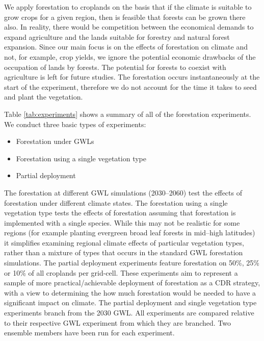 \documentclass[]{article}
\begin{document}
We apply forestation to croplands on the basis that if the climate is suitable to grow crops for a given region, then is feasible that forests can be grown there also. In reality, there would be competition between the economical demands to expand agriculture and the lands suitable for forestry and natural forest expansion.
Since our main focus is on the effects of forestation on climate and not, for example, crop yields, we ignore the potential economic drawbacks of the occupation of lands by forests.
The potential for forests to coexist with agriculture is left for future studies.
The forestation occurs instantaneously at the start of the experiment, therefore we do not account for the time it takes to seed and plant the vegetation.

Table \ref{tab:experiments} shows a summary of all of the forestation experiments. We conduct three basic types of experiments:

\begin{itemize}
    \item Forestation under GWLs
    \item Forestation using a single vegetation type
    \item Partial deployment
\end{itemize}

The forestation at different GWL simulations (2030--2060) test the effects of forestation under different climate states.
The forestation using a single vegetation type tests the effects of forestation assuming that forestation is implemented with a single species.
While this may not be realistic for some regions (for example planting evergreen broad leaf forests in mid--high latitudes) it simplifies examining regional climate effects of particular vegetation types, rather than a mixture of types that occurs in the standard GWL forestation simulations.
The partial deployment experiments feature forestation on 50\%, 25\% or 10\% of all croplands per grid-cell.
These experiments aim to represent a sample of more practical/achievable deployment of forestation as a CDR strategy, with a view to determining the how much forestation would be needed to have a significant impact on climate.
The partial deployment and single vegetation type experiments branch from the 2030 GWL.
All experiments are compared relative to their respective GWL experiment from which they are branched.
Two ensemble members have been run for each experiment.
\end{document}
